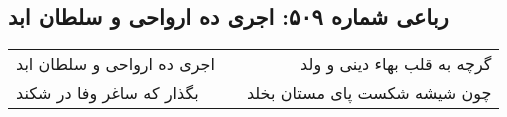 \begin{center}
\section*{رباعی شماره ۵۰۹: اجری ده ارواحی و سلطان ابد}
\label{sec:0509}
\begin{longtable}{l p{0.5cm} r}
اجری ده ارواحی و سلطان ابد
&&
گرچه به قلب بهاء دینی و ولد
\\
بگذار که ساغر وفا در شکند
&&
چون شیشه شکست پای مستان بخلد
\\
\end{longtable}
\end{center}
